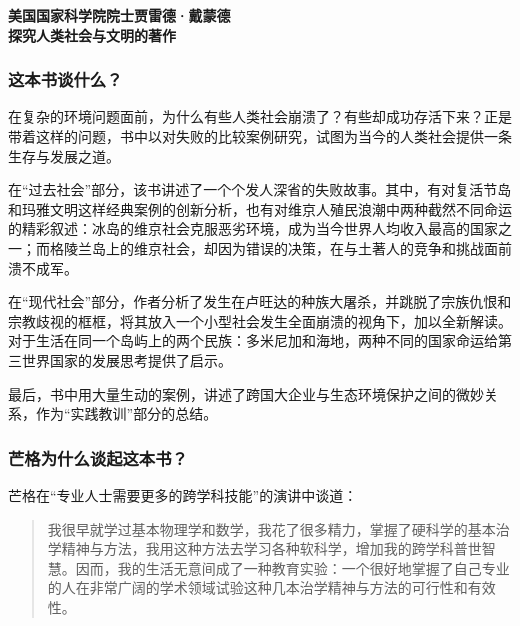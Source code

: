 \cleardoublepage
{}


\begin{BookSummaryBox}
{\centering \textbf{美国国家科学院院士贾雷德·戴蒙德\\ 探究人类社会与文明的著作}\par}
\end{BookSummaryBox}

\subsubsection*{这本书谈什么？}

在复杂的环境问题面前，为什么有些人类社会崩溃了？有些却成功存活下来？正是带着这样的问题，书中以对失败的比较案例研究，试图为当今的人类社会提供一条生存与发展之道。
\par

在“过去社会”部分，该书讲述了一个个发人深省的失败故事。其中，有对复活节岛和玛雅文明这样经典案例的创新分析，也有对维京人殖民浪潮中两种截然不同命运的精彩叙述：冰岛的维京社会克服恶劣环境，成为当今世界人均收入最高的国家之一；而格陵兰岛上的维京社会，却因为错误的决策，在与土著人的竞争和挑战面前溃不成军。
\par

在“现代社会”部分，作者分析了发生在卢旺达的种族大屠杀，并跳脱了宗族仇恨和宗教歧视的框框，将其放入一个小型社会发生全面崩溃的视角下，加以全新解读。对于生活在同一个岛屿上的两个民族：多米尼加和海地，两种不同的国家命运给第三世界国家的发展思考提供了启示。
\par

最后，书中用大量生动的案例，讲述了跨国大企业与生态环境保护之间的微妙关系，作为“实践教训”部分的总结。
\par

\subsubsection*{芒格为什么谈起这本书？}

芒格在“专业人士需要更多的跨学科技能”的演讲中谈道：
\par

\begin{quotation}
我很早就学过基本物理学和数学，我花了很多精力，掌握了硬科学的基本治学精神与方法，我用这种方法去学习各种软科学，增加我的跨学科普世智慧。因而，我的生活无意间成了一种教育实验：一个很好地掌握了自己专业的人在非常广阔的学术领域试验这种几本治学精神与方法的可行性和有效性。
\par
\end{quotation}

